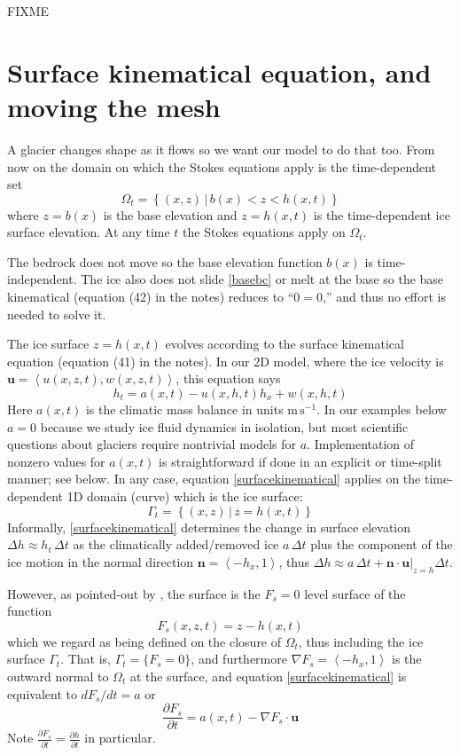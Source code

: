 \documentclass[letterpaper,final,12pt,reqno]{amsart}
\newcommand{\pp}[2]{\ensuremath{\frac{\partial #1}{\partial #2}}}
\newcommand{\grad}{\nabla}
\newcommand{\bn}{\mathbf{n}}
\newcommand{\bu}{\mathbf{u}}
\begin{document}
FIXME


\section{Surface kinematical equation, and moving the mesh}

A glacier changes shape as it flows so we want our model to do that too.  From now on the domain on which the Stokes equations apply is the time-dependent set
\begin{equation}
\Omega_t = \left\{(x,z)\,\big|\, b(x) < z < h(x,t)\right\}  \label{Omegat}
\end{equation}
where $z=b(x)$ is the base elevation and $z=h(x,t)$ is the time-dependent ice surface elevation.  At any time $t$ the Stokes equations apply on $\Omega_t$.

The bedrock does not move so the base elevation function $b(x)$ is time-independent.  The ice also does not slide \eqref{basebc} or melt at the base so the base kinematical (equation (42) in the notes) reduces to ``$0=0$,'' and thus no effort is needed to solve it.

The ice surface $z=h(x,t)$ evolves according to the surface kinematical equation (equation (41) in the notes).  In our 2D model, where the ice velocity is $\bu=\left<u(x,z,t),w(x,z,t)\right>$, this equation says
\begin{equation}
h_t = a(x,t) - u(x,h,t) h_x + w(x,h,t) \label{surfacekinematical}
\end{equation}
Here $a(x,t)$ is the climatic mass balance in units $\text{m}\,\text{s}^{-1}$.  In our examples below $a=0$ because we study ice fluid dynamics in isolation, but most scientific questions about glaciers require nontrivial models for $a$.  Implementation of nonzero values for $a(x,t)$ is straightforward if done in an explicit or time-split manner; see below.  In any case, equation \eqref{surfacekinematical} applies on the time-dependent 1D domain (curve) which is the ice surface:
    $$\Gamma_t = \left\{(x,z) \,\big|\, z = h(x,t)\right\}$$
Informally, \eqref{surfacekinematical} determines the change in surface elevation $\Delta h \approx h_t\,\Delta t$ as the climatically added/removed ice $a\,\Delta t$ plus the component of the ice motion in the normal direction $\bn = \left<-h_x,1\right>$, thus $\Delta h \approx a \,\Delta t + \bn\cdot \bu\big|_{z=h} \Delta t$.

However, as pointed-out by \cite[pp.~65--66]{GreveBlatter2009}, the surface is the $F_s=0$ level surface of the function
    $$F_s(x,z,t) = z - h(x,t)$$
which we regard as being defined on the closure of $\Omega_t$, thus including the ice surface $\Gamma_t$.  That is, $\Gamma_t = \{F_s = 0\}$, and furthermore $\grad F_s = \left<-h_x,1\right>$ is the outward normal to $\Omega_t$ at the surface, and equation \eqref{surfacekinematical} is equivalent to $dF_s/dt=a$ or
\begin{equation}
\pp{F_s}{t} = a(x,t) - \grad F_s \cdot \bu \label{Fsurfacekinematical}
\end{equation}
Note $\pp{F_s}{t} = \pp{h}{t}$ in particular.
\end{document}
